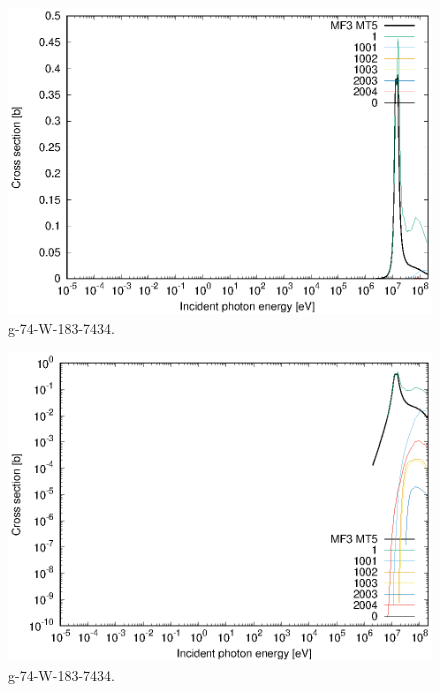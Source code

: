 \begin{figure}
 \includegraphics[width=\linewidth]{eps/g_74-W-183_7434.eps}
  \caption{g-74-W-183-7434.}
\end{figure}
\begin{figure}
 \includegraphics[width=\linewidth]{eps-log/g_74-W-183_7434.eps}
 \caption{g-74-W-183-7434.}
\end{figure}
\newpage \clearpage

